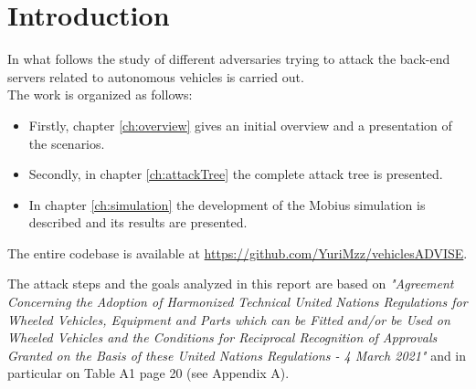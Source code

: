%
\chapter{Introduction}\label{ch:introduction}
In what follows the study of different adversaries trying to attack the back-end servers related to autonomous vehicles is carried out.\\

The work is organized as follows:
\begin{itemize}
    \item Firstly, chapter \ref{ch:overview} gives an initial overview and a presentation of the scenarios.
    \item Secondly, in chapter \ref{ch:attackTree} the complete attack tree is presented.
    \item In chapter \ref{ch:simulation} the development of the Mobius simulation is described and its results are presented.
\end{itemize}
    
\noindent
The entire codebase is available at \url{https://github.com/YuriMzz/vehiclesADVISE}.

\vspace{0.2cm}
\noindent The attack steps and the goals analyzed in this report are based on \textit{"Agreement Concerning the Adoption of Harmonized Technical United Nations Regulations for Wheeled Vehicles, Equipment and Parts which can be Fitted and/or be Used on Wheeled Vehicles and the Conditions for Reciprocal Recognition of Approvals Granted on the Basis of these United Nations Regulations - 4 March 2021"} and in particular on Table A1 page 20 (see Appendix A).